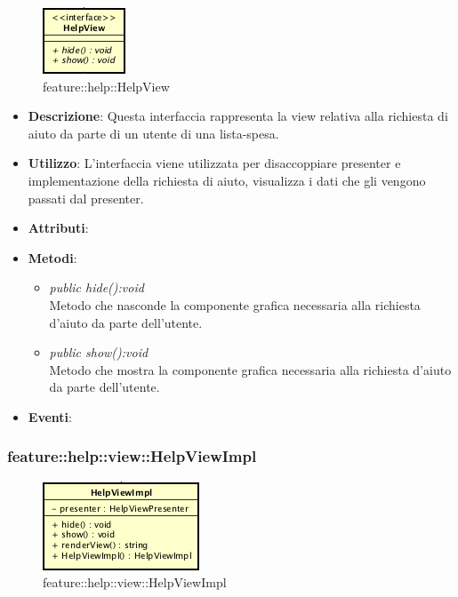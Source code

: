 \label{feature::help::HelpView}
\begin{figure}[ht]
	\centering
	\includegraphics[scale=0.5]{Sezioni/SottosezioniST/img/app/HelpView.png}
	\caption{feature::help::HelpView}
\end{figure}

\begin{itemize}
\item \textbf{Descrizione}: Questa interfaccia rappresenta la view relativa alla richiesta di aiuto da parte di un utente di una lista-spesa.
\item \textbf{Utilizzo}: L'interfaccia viene utilizzata per disaccoppiare presenter e implementazione della richiesta di aiuto, visualizza i dati che gli vengono passati dal presenter.
\item \textbf{Attributi}:
\item \textbf{Metodi}:
	\begin{itemize}
	\item \textit{public hide():void}\\
	Metodo che nasconde la componente grafica necessaria alla richiesta d'aiuto da parte dell'utente.
	\item \textit{public show():void}\\
	Metodo che mostra la componente grafica necessaria alla richiesta d'aiuto da parte dell'utente.
	\end{itemize}
\item \textbf{Eventi}:
\end{itemize}

\subsubsection{feature::help::view::HelpViewImpl}

\label{feature::help::view::HelpViewImpl}
\begin{figure}[ht]
	\centering
	\includegraphics[scale=0.5]{Sezioni/SottosezioniST/img/app/HelpViewImpl.png}
	\caption{feature::help::view::HelpViewImpl}
\end{figure}


